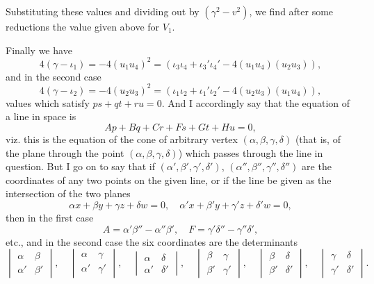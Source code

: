 \documentclass[11pt,a4paper]{book}
\begin{document}
Substituting these values and dividing out by $(\gamma^2 - v^2)$, we find after some reductions the value given above for $V_1$.

Finally we have
\[
4(\gamma - \iota_1) = -4(u_1u_4)^2 = (\iota_3\iota_4 + \iota_3'\iota_4' - 4(u_1u_4)(u_2u_3)),\]
and in the second case
\[
4(\gamma - \iota_2) = -4(u_2u_3)^2 = (\iota_1\iota_2 + \iota_1'\iota_2' - 4(u_2u_3)(u_1u_4)),\]
values which satisfy $ps + qt + ru = 0$. And I accordingly say that the equation of a line in space is
\[
Ap + Bq + Cr + Fs + Gt + Hu = 0,
\]
viz. this is the equation of the cone of arbitrary vertex $(\alpha, \beta, \gamma, \delta)$ (that is, of the plane through the point $(\alpha, \beta, \gamma, \delta)$) which passes through the line in question. But I go on to say that if $(\alpha', \beta', \gamma', \delta')$, $(\alpha'', \beta'', \gamma'', \delta'')$ are the coordinates of any two points on the given line, or if the line be given as the intersection of the two planes
\[
\alpha x + \beta y + \gamma z + \delta w = 0,\quad \alpha' x + \beta' y + \gamma' z + \delta' w = 0,
\]
then in the first case
\[
A = \alpha'\beta'' - \alpha''\beta',\quad F = \gamma'\delta'' - \gamma''\delta',
\]
etc., and in the second case the six coordinates are the determinants
\[
\begin{vmatrix}
\alpha & \beta \\
\alpha' & \beta'
\end{vmatrix},\quad
\begin{vmatrix}
\alpha & \gamma \\
\alpha' & \gamma'
\end{vmatrix},\quad
\begin{vmatrix}
\alpha & \delta \\
\alpha' & \delta'
\end{vmatrix},\quad
\begin{vmatrix}
\beta & \gamma \\
\beta' & \gamma'
\end{vmatrix},\quad
\begin{vmatrix}
\beta & \delta \\
\beta' & \delta'
\end{vmatrix},\quad
\begin{vmatrix}
\gamma & \delta \\
\gamma' & \delta'
\end{vmatrix}.
\]

\vspace{0.5em}
\end{document}
